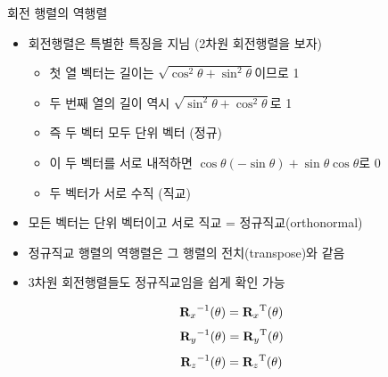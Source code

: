 \begin{frame}{회전 행렬의 역행렬}

\begin{itemize}
\item 회전행렬은 특별한 특징을 지님 (2차원 회전행렬을 보자)
	\begin{itemize}
	\item 첫 열 벡터는 길이는 $\sqrt{ \cos^2 \theta + \sin^2 \theta}$이므로 1
	\item 두 번째 열의 길이 역시 $\sqrt{ \sin^2 \theta + \cos^2 \theta}$로 1
	\item 즉 두 벡터 모두 단위 벡터 (정규)
	\item 이 두 벡터를 서로 내적하면 $\cos \theta ( - \sin \theta) + \sin \theta  \cos \theta $로 0
	\item 두 벡터가 서로 수직 (직교)
	\end{itemize}
\item 모든 벡터는 단위 벡터이고 서로 직교 = 정규직교(orthonormal)
\item 정규직교 행렬의 역행렬은 그 행렬의 전치(transpose)와 같음
\item 3차원 회전행렬들도 정규직교임을 쉽게 확인 가능
\end{itemize}

$${{\mathbf R}_x}^{-1}(\theta) = {{\mathbf R}_x}^{\rm T}(\theta)$$
$${{\mathbf R}_y}^{-1}(\theta) = {{\mathbf R}_y}^{\rm T}(\theta)$$
$${{\mathbf R}_z}^{-1}(\theta) = {{\mathbf R}_z}^{\rm T}(\theta)$$

\end{frame}

